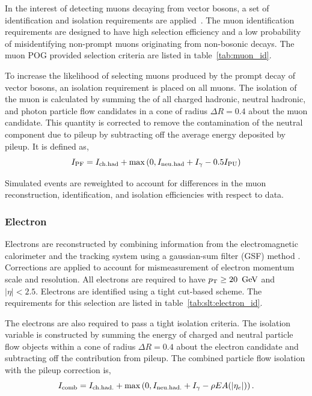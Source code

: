 In the interest of detecting muons decaying from vector bosons, a set of identification and isolation requirements are applied~\cite{Sirunyan:2018fpa}. The muon identification requirements are designed to have high selection efficiency and a low probability of misidentifying non-prompt muons originating from non-bosonic decays. The muon POG provided selection criteria are listed in table~\ref{tab:muon_id}.



\noindent To increase the likelihood of selecting muons produced by the prompt decay of vector bosons, an isolation requirement is placed on all muons. The isolation of the muon is calculated by summing the \pt of all charged hadronic, neutral hadronic, and photon particle flow candidates in a cone of radius $\Delta R = 0.4$ about the muon candidate. This quantity is corrected to remove the contamination of the neutral component due to pileup by subtracting off the average energy deposited by pileup. It is defined as,
\begin{equation}
    I_{\rm PF} = I_{\rm ch. had} + \max \left(0, I_{\rm neu. had} +
    I_{\gamma} - 0.5 I_{\rm PU}\right)
\end{equation}

Simulated events are reweighted to account for differences in the muon reconstruction, identification, and isolation efficiencies with respect to data.







\subsubsection{Electron}

Electrons are reconstructed by combining information from the electromagnetic calorimeter and the tracking system using a gaussian-sum
filter (GSF) method \cite{Baffioni:2006cd}.  Corrections are applied to account for mismeasurement of electron momentum scale and resolution. All electrons are required to have $p_{\mathrm{T}} \geq 20~\,\text{Ge\hspace{-.08em}V}$ and $|\eta| < 2.5$.  Electrons are identified using a tight cut-based scheme. The requirements for this selection are listed in table~\ref{tab:slt:electron_id}.



\noindent The electrons are also required to pass a tight isolation criteria. The isolation variable is constructed by summing the energy of charged and neutral particle flow objects within a cone of radius $\Delta R = 0.4$ about the electron candidate and subtracting off the contribution from pileup.  The combined particle flow isolation with the pileup correction is,
\begin{equation}
    \nonumber
    I_{\rm comb} = I_{\rm ch. had.} + \max\left(  0, I_{\rm neu. had.} + I_{\gamma} - \rho EA(|\eta_{e}|) \right).
\end{equation}

